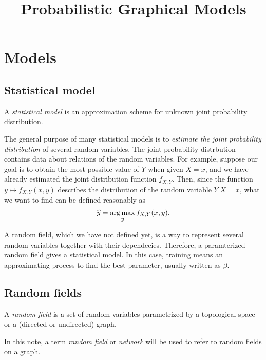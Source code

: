 \documentclass{../exp}
\title{Probabilistic Graphical Models}
\begin{document}
\maketitle
\tableofcontents




\section{Models}

\subsection{Statistical model}
\begin{defn}
A \emph{statistical model} is an approximation scheme for unknown joint probability distribution.
\end{defn}
The general purpose of many statistical models is to \emph{estimate the joint probability distribution} of several random variables.
The joint probability distrbution contains data about relations of the random variables.
For example, suppose our goal is to obtain the most possible value of $Y$ when given $X=x$, and we have already estimated the joint distribution function $f_{X,Y}$.
Then, since the function $y\mapsto f_{X,Y}(x,y)$ describes the distribution of the random variable $Y|X=x$, what we want to find can be defined reasonably as
\[\widehat y=\operatorname*{arg\,max}_yf_{X,Y}(x,y).\]

\begin{ex}
A random field, which we have not defined yet, is a way to represent several random variables together with their dependecies.
Therefore, a paramterized random field gives a statistical model.
In this case, training means an approximating process to find the best parameter, usually written as $\beta$.
\end{ex}

\subsection{Random fields}
\begin{defn}
A \emph{random field} is a set of random variables parametrized by a topological space or a (directed or undirected) graph.
\end{defn}
\begin{defn}
In this note, a term \emph{random field} or \emph{network} will be used to refer to random fields on a graph.
\end{defn}
\end{document}
